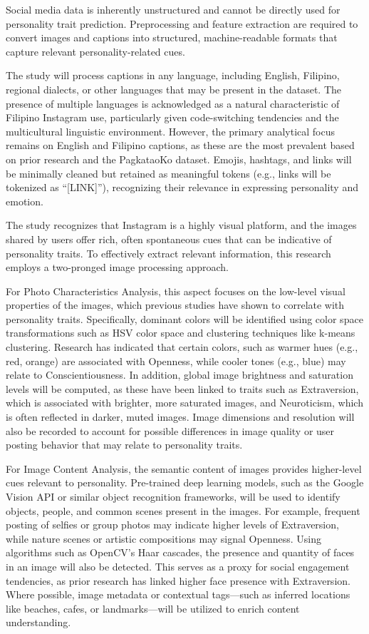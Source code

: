 	Social media data is inherently unstructured and cannot be directly used for personality trait prediction. Preprocessing and feature extraction are required to convert images and captions into structured, machine-readable formats that capture relevant personality-related cues.
	
	The study will process captions in any language, including English, Filipino, regional dialects, or other languages that may be present in the dataset. The presence of multiple languages is acknowledged as a natural characteristic of Filipino Instagram use, particularly given code-switching tendencies and the multicultural linguistic environment. However, the primary analytical focus remains on English and Filipino captions, as these are the most prevalent based on prior research and the PagkataoKo dataset. Emojis, hashtags, and links will be minimally cleaned but retained as meaningful tokens (e.g., links will be tokenized as “[LINK]”), recognizing their relevance in expressing personality and emotion.
	
	The study recognizes that Instagram is a highly visual platform, and the images shared by users offer rich, often spontaneous cues that can be indicative of personality traits. To effectively extract relevant information, this research employs a two-pronged image processing approach.
	
	For Photo Characteristics Analysis, this aspect focuses on the low-level visual properties of the images, which previous studies have shown to correlate with personality traits. Specifically, dominant colors will be identified using color space transformations such as HSV color space and clustering techniques like k-means clustering. Research has indicated that certain colors, such as warmer hues (e.g., red, orange) are associated with Openness, while cooler tones (e.g., blue) may relate to Conscientiousness. In addition, global image brightness and saturation levels will be computed, as these have been linked to traits such as Extraversion, which is associated with brighter, more saturated images, and Neuroticism, which is often reflected in darker, muted images. Image dimensions and resolution will also be recorded to account for possible differences in image quality or user posting behavior that may relate to personality traits.
	
	For Image Content Analysis, the semantic content of images provides higher-level cues relevant to personality. Pre-trained deep learning models, such as the Google Vision API or similar object recognition frameworks, will be used to identify objects, people, and common scenes present in the images. For example, frequent posting of selfies or group photos may indicate higher levels of Extraversion, while nature scenes or artistic compositions may signal Openness. Using algorithms such as OpenCV’s Haar cascades, the presence and quantity of faces in an image will also be detected. This serves as a proxy for social engagement tendencies, as prior research has linked higher face presence with Extraversion. Where possible, image metadata or contextual tags—such as inferred locations like beaches, cafes, or landmarks—will be utilized to enrich content understanding.
	
